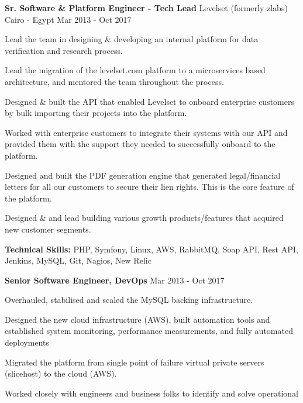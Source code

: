 \begin{cventries}
	\cventry
	{\textbf{Sr. Software \& Platform Engineer - Tech Lead}} %
	{Levelset (formerly zlabs)} %
	{Cairo - Egypt} %
	{Mar 2013 - Oct 2017} %
	{
		\begin{cvitems} %
			\item {Lead the team in designing \& developing an internal platform for data verification
			            and research process.}
			\item {Lead the migration of the levelset.com platform to a microservices based
			            architecture, and mentored the team throughout the process.}
			\item {Designed \& built the API that enabled Levelset to onboard enterprise customers by
			            bulk importing their projects into the platform.}
			\item {Worked with enterprise customers to integrate their systems with our API and provided
			            them with the support they needed to successfully onboard to the platform.}
			\item {Designed and built the PDF generation engine that generated legal/financial letters
			            for all our customers to secure their lien rights. This is the core feature of the
			            platform.}
			\item {Designed \& and lead building various growth products/features that acquired new
			            customer segments.}
			\item {\textbf{Technical Skills:} PHP, Symfony, Linux, AWS, RabbitMQ, Soap API, Rest API,
			            Jenkins, MySQL, Git, Nagios, New Relic}
		\end{cvitems}
	}
	\cventry
	{\textbf{Senior Software Engineer, DevOps}} %
	{} %
	{} %
	{Mar 2013 - Oct 2017} %
	{
		\begin{cvitems} %
			\item {Overhauled, stabilised and scaled the MySQL backing infrastructure.}
			\item {Designed the new cloud infrastructure (AWS), built automation tools and established
			            system monitoring, performance measurements, and fully automated deployments}
			\item {Migrated the platform from single point of failure virtual private servers
			            (slicehost) to the cloud (AWS).}
			\item {Worked closely with engineers and business folks to identify and solve operational
}
\end{cvitems}}
\end{cventries}
